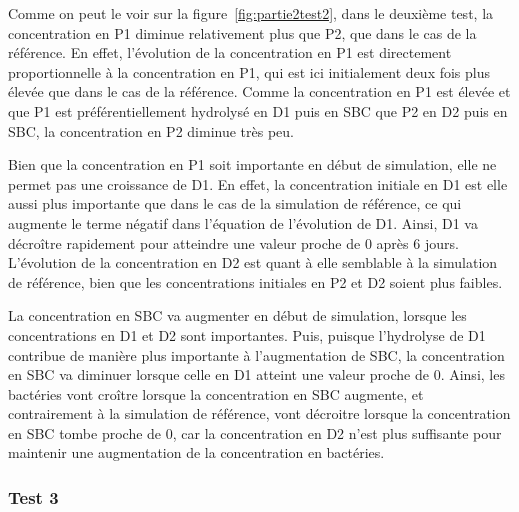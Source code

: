 \par{
Comme on peut le voir sur la figure~\ref{fig:partie2test2}, dans le deuxième test,
la concentration en P1 diminue relativement plus que P2, que dans le cas de la r\'ef\'erence. En effet, l'\'evolution de la concentration en P1 est directement proportionnelle \`a la concentration en P1, qui est ici initialement deux fois plus \'elev\'ee que dans le cas de la r\'ef\'erence. Comme la concentration en P1 est \'elev\'ee et que P1 est pr\'ef\'erentiellement hydrolys\'e en D1 puis en SBC que P2 en D2 puis en SBC, la concentration en P2 diminue tr\`es peu.
}
\par{
Bien que la concentration en P1 soit importante en d\'ebut de simulation, elle ne permet pas une croissance de D1. En effet, la concentration initiale en D1 est elle aussi plus importante que dans le cas de la simulation de r\'ef\'erence, ce qui augmente le terme n\'egatif dans l'\'equation de l'\'evolution de D1. Ainsi, D1 va d\'ecro\^itre rapidement pour atteindre une valeur proche de 0 apr\`es 6 jours. L'\'evolution de la concentration en D2 est quant \`a elle semblable \`a la simulation de r\'ef\'erence, bien que les concentrations initiales en P2 et D2 soient plus faibles.
}
\par{
La concentration en SBC va augmenter en d\'ebut de simulation, lorsque les concentrations en D1 et D2 sont importantes. Puis, puisque l'hydrolyse de D1 contribue de mani\`ere plus importante \`a l'augmentation de SBC, la concentration en SBC va diminuer lorsque celle en D1 atteint une valeur proche de 0. Ainsi, les bact\'eries vont cro\^itre lorsque la concentration en SBC augmente, et contrairement \`a la simulation de r\'ef\'erence, vont d\'ecroitre lorsque la concentration en SBC tombe proche de 0, car la concentration en D2 n'est plus suffisante pour maintenir une augmentation de la concentration en bact\'eries.
}

\FloatBarrier
\newpage
\subsubsection{Test 3}

